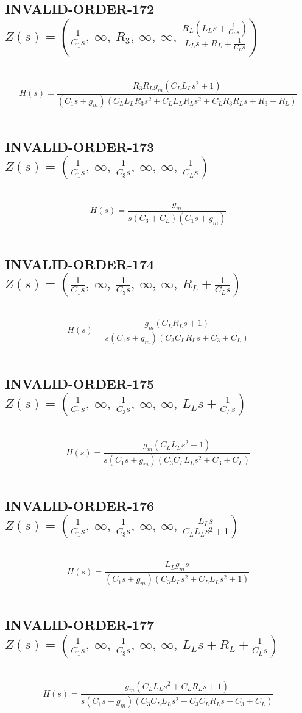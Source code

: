 \documentclass{article}
\begin{document}
\subsection{INVALID-ORDER-172 $Z(s) = \left( \frac{1}{C_{1} s}, \  \infty, \  R_{3}, \  \infty, \  \infty, \  \frac{R_{L} \left(L_{L} s + \frac{1}{C_{L} s}\right)}{L_{L} s + R_{L} + \frac{1}{C_{L} s}}\right)$ } \ 
\textbf{\[H(s) = \frac{R_{3} R_{L} g_{m} \left(C_{L} L_{L} s^{2} + 1\right)}{\left(C_{1} s + g_{m}\right) \left(C_{L} L_{L} R_{3} s^{2} + C_{L} L_{L} R_{L} s^{2} + C_{L} R_{3} R_{L} s + R_{3} + R_{L}\right)}\] } \ 
\subsection{INVALID-ORDER-173 $Z(s) = \left( \frac{1}{C_{1} s}, \  \infty, \  \frac{1}{C_{3} s}, \  \infty, \  \infty, \  \frac{1}{C_{L} s}\right)$ } \ 
\textbf{\[H(s) = \frac{g_{m}}{s \left(C_{3} + C_{L}\right) \left(C_{1} s + g_{m}\right)}\] } \ 
\subsection{INVALID-ORDER-174 $Z(s) = \left( \frac{1}{C_{1} s}, \  \infty, \  \frac{1}{C_{3} s}, \  \infty, \  \infty, \  R_{L} + \frac{1}{C_{L} s}\right)$ } \ 
\textbf{\[H(s) = \frac{g_{m} \left(C_{L} R_{L} s + 1\right)}{s \left(C_{1} s + g_{m}\right) \left(C_{3} C_{L} R_{L} s + C_{3} + C_{L}\right)}\] } \ 
\subsection{INVALID-ORDER-175 $Z(s) = \left( \frac{1}{C_{1} s}, \  \infty, \  \frac{1}{C_{3} s}, \  \infty, \  \infty, \  L_{L} s + \frac{1}{C_{L} s}\right)$ } \ 
\textbf{\[H(s) = \frac{g_{m} \left(C_{L} L_{L} s^{2} + 1\right)}{s \left(C_{1} s + g_{m}\right) \left(C_{3} C_{L} L_{L} s^{2} + C_{3} + C_{L}\right)}\] } \ 
\subsection{INVALID-ORDER-176 $Z(s) = \left( \frac{1}{C_{1} s}, \  \infty, \  \frac{1}{C_{3} s}, \  \infty, \  \infty, \  \frac{L_{L} s}{C_{L} L_{L} s^{2} + 1}\right)$ } \ 
\textbf{\[H(s) = \frac{L_{L} g_{m} s}{\left(C_{1} s + g_{m}\right) \left(C_{3} L_{L} s^{2} + C_{L} L_{L} s^{2} + 1\right)}\] } \ 
\subsection{INVALID-ORDER-177 $Z(s) = \left( \frac{1}{C_{1} s}, \  \infty, \  \frac{1}{C_{3} s}, \  \infty, \  \infty, \  L_{L} s + R_{L} + \frac{1}{C_{L} s}\right)$ } \ 
\textbf{\[H(s) = \frac{g_{m} \left(C_{L} L_{L} s^{2} + C_{L} R_{L} s + 1\right)}{s \left(C_{1} s + g_{m}\right) \left(C_{3} C_{L} L_{L} s^{2} + C_{3} C_{L} R_{L} s + C_{3} + C_{L}\right)}\] } \ 
\end{document}
